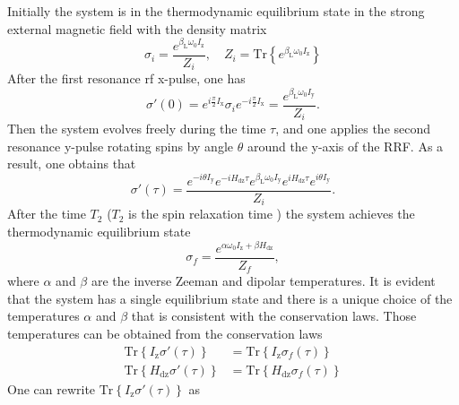 \documentclass[review]{elsarticle}
\begin{document}
Initially the system is in the thermodynamic equilibrium state in the strong external magnetic field with the density matrix
%
\begin{equation}
    \label{eq:a1}
   \sigma_{i} = \dfrac{e^{\beta_\mathrm{L} \omega_{0} I_\mathrm{z}}}{Z_{i}} ,
   \quad
   Z_{i} = \mathrm{Tr}\left\{e^{\beta_\mathrm{L} \omega_{0} I_\mathrm{z}} \right\}
\end{equation}
%
After the first resonance rf x-pulse, one has
%
\begin{equation}
    \label{eq:a2}
    \sigma'(0) = e^{ i \frac \pi 2 I_\mathrm{x}}
    \sigma_{i}
    e^{-i \frac \pi 2 I_\mathrm{x}}
    = \dfrac{e^{\beta_\mathrm{L} \omega_{0} I_\mathrm{y}}}{Z_{i}}  .
\end{equation}
%
Then the system evolves freely during the time $\tau$, 
and one applies the second resonance y-pulse rotating spins by angle $\theta$ around the y-axis of the RRF.
As a result, one obtains that
\begin{equation}
    \label{eq:a3}
    \sigma'(\tau) 
    = \dfrac{
      e^{-i \theta I_\mathrm{y}} e^{-i H_\mathrm{dz} \tau} 
      e^{\beta_\mathrm{L} \omega_{0} I_\mathrm{y}}
      e^{i H_\mathrm{dz} \tau} e^{i \theta I_\mathrm{y}}
    }{Z_{i}}. 
\end{equation}
%
After the time $T_2$ ($T_2$ is the spin relaxation time \cite{Goldman_1970}) the system achieves the thermodynamic equilibrium state
\begin{equation}
    \label{eq:a4}
    \sigma_{f} 
    = \dfrac{ e^{\alpha \omega_{0} I_\mathrm{z} + \beta H_\mathrm{dz}} }{Z_f},
\end{equation}
%
where $\alpha$ and $\beta$ are the inverse Zeeman and dipolar temperatures.
It is evident that the system has a single equilibrium state 
and there is a unique choice of the temperatures $\alpha$ and $\beta$ 
that is consistent with the conservation laws.
Those temperatures can be obtained from the conservation laws
\begin{align}
    \label{eq:a5}
    \mathrm{Tr} \left\{ I_\mathrm{z} \sigma'(\tau) \right\}
    & = \mathrm{Tr} \left\{ I_\mathrm{z} \sigma_{f}(\tau) \right\}
    \\
    \label{eq:a6}
    \mathrm{Tr} \left\{ H_\mathrm{dz} \sigma'(\tau) \right\}
    & = \mathrm{Tr} \left\{ H_\mathrm{dz} \sigma_{f}(\tau) \right\}
\end{align}
%
One can rewrite $\mathrm{Tr} \left\{ I_\mathrm{z} \sigma'(\tau) \right\}$ as 
%
\end{document}
